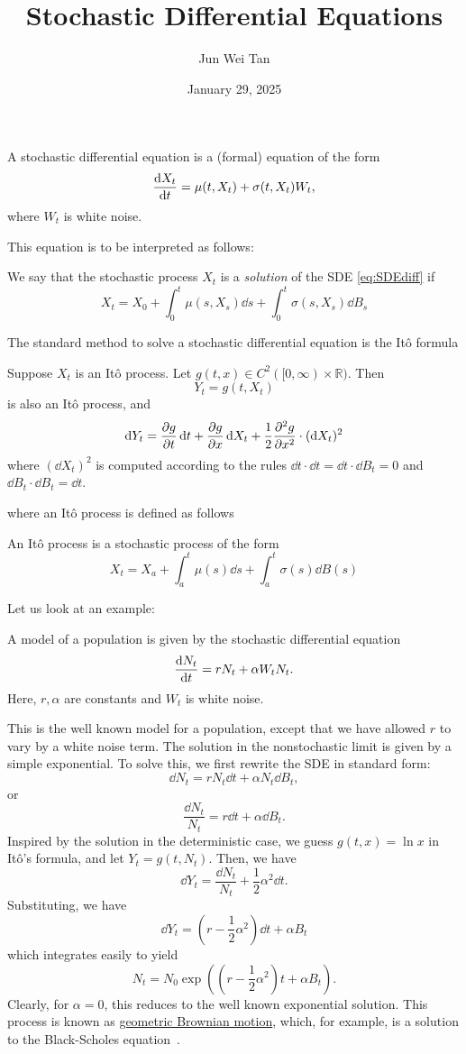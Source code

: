 \documentclass[prb,12pt]{revtex4-2}
\theoremstyle{definition}
\theoremstyle{definition}
\theoremstyle{definition}
\newcommand{\R}{\mathbb{R}}
\begin{document}
	\title{Stochastic Differential Equations}
	\author{Jun Wei Tan}
	\date{January 29, 2025}
	\maketitle

\begin{Definition}
	A stochastic differential equation is a (formal) equation of the form
	\begin{equation}\label{eq:SDEdiff}
	\dv{X_t}{t}=\mu(t, X_t)+\sigma(t, X_t)W_t,
\end{equation}
	where $W_t$ is white noise. 
\end{Definition}
This equation is to be interpreted as follows:
\begin{Definition}
	We say that the stochastic process $X_t$ is a \emph{solution} of the SDE \eqref{eq:SDEdiff} if
	\[X_t = X_0+\int_0^t \mu(s, X_s)\dd{s}+ \int_0^t \sigma(s, X_s)\dd{B_s}\]
\end{Definition}
The standard method to solve a stochastic differential equation is the Itô formula
\begin{Theorem}
	Suppose $X_t$ is an Itô process. Let $g(t,x)\in C^2([0,\infty)\times \R)$. Then
	\[Y_t=g(t, X_t)\]
	is also an Itô process, and
	\[\dd{Y_t}=\pdv{g}{t}(t, X_t)\dd{t}+\pdv{g}{x}(t, X_t)\dd{X_t}+\frac 12 \pdv[2]{g}{x}(t, X_t)\cdot (\dd{X_t})^2\]
	where $(\dd{X_t})^2$ is computed according to the rules $\dd{t}\cdot \dd{t} = \dd{t}\cdot \dd{B_t}=0$ and $\dd{B_t}\cdot \dd{B_t}=\dd{t}$.
\end{Theorem}
where an Itô process is defined as follows
\begin{Definition}
	An Itô process is a stochastic process of the form
	\[X_t = X_a +\int_a^t \mu(s)\dd{s} + \int_a^t \sigma(s)\dd{B(s)}\]
\end{Definition}
Let us look at an example:
\begin{Example}
	A model of a population is given by the stochastic differential equation
	\[\dv{N_t}{t} = r N_t + \alpha W_t N_t.\]
	Here, $r,\alpha$ are constants and $W_t$ is white noise.
\end{Example}
This is the well known model for a population, except that we have allowed $r$ to vary by a white noise term. The solution in the nonstochastic limit is given by a simple exponential. To solve this, we first rewrite the SDE in standard form:
\[\dd{N_t}=r N_t\dd{t}+\alpha N_t \dd{B_t},\]
or
\[\frac{\dd{N_t}}{N_t} = r \dd{t} + \alpha \dd{B_t}.\]
Inspired by the solution in the deterministic case, we guess $g(t, x)=\ln x$ in Itô's formula, and let $Y_t=g(t, N_t)$. Then, we have
\[\dd{Y_t}=\frac{\dd{N_t}}{N_t}+\frac 12 \alpha^2 \dd{t}.\]
Substituting, we have
\[\dd{Y_t} = \left(r- \frac 12\alpha^2 \right)\dd{t} +\alpha B_t\]
which integrates easily to yield
\[N_t = N_0 \exp\left(\left(r - \frac 12 \alpha^2\right)t+\alpha B_t\right).\]
Clearly, for $\alpha=0$, this reduces to the well known exponential solution. This process is known as \uline{geometric Brownian motion}, which, for example, is a solution to the Black-Scholes equation~\cite{inbook}.
\end{document}
